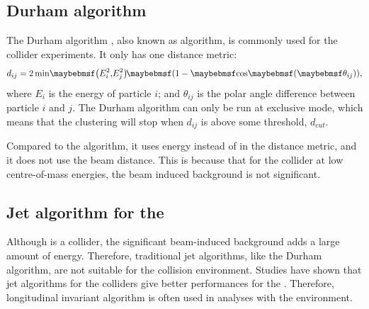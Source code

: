 \subsection{Durham algorithm}
\label{sec:pandoraJetDurham}
The Durham algorithm \cite{Catani:1991hj}, also known as \ee \kt algorithm, is commonly used for the \ee collider experiments. It only has one distance metric:
\begin{equation}
d_{ij} = 2\min\!\parenths{E_i^2,\!E_j^2}\!\parenths{1 - \cosOf{\theta_{ij}}},
\end{equation}
where $E_i$ is the energy of particle $i$; and $\theta_{ij}$ is the polar angle difference between particle $i$ and $j$. The Durham algorithm can only be run at exclusive mode, which means that the clustering will stop when $d_{ij}$ is above some threshold, $d_{cut}$.

Compared to the \kt algorithm, it uses energy instead of \pT in the distance metric, and it does not use the beam distance. This is because that for the \ee collider at low centre-of-mass energies, the beam induced background is not significant.

\subsection{Jet algorithm for the \CLIC}

Although \CLIC is a \ee collider, the significant beam-induced background adds a large amount of energy. Therefore, traditional \ee jet algorithms, like the Durham algorithm, are not suitable for the \CLIC collision environment. Studies have shown that jet algorithms for the \pp colliders give better performances for the \CLIC \cite{Linssen:2012hp,LCD-Note-2010-006}. Therefore, longitudinal invariant \kt algorithm is often used in analyses with the \CLIC environment.




